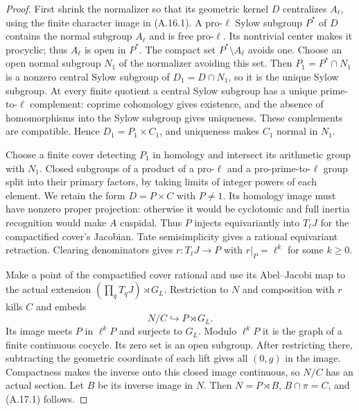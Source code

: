 \begin{proof}
First shrink the normalizer so that its geometric kernel $D$
centralizes $A_\ell$, using the finite character image in
(A.16.1). A pro-$\ell$ Sylow subgroup $P^*$ of $D$ contains
the normal subgroup $A_\ell$ and is free pro-$\ell$. Its
nontrivial center makes it procyclic; thus $A_\ell$ is open
in $P^*$. The compact set $P^*\setminus A_\ell$ avoids one.
Choose an open normal subgroup $N_1$ of the normalizer avoiding
this set. Then $P_1=P^*\cap N_1$ is a nonzero central Sylow
subgroup of $D_1=D\cap N_1$, so it is the unique Sylow subgroup.
At every finite quotient a central Sylow subgroup has a unique
prime-to-$\ell$ complement: coprime cohomology gives existence,
and the absence of homomorphisms into the Sylow subgroup gives
uniqueness. These complements are compatible. Hence
$D_1=P_1\times C_1$, and uniqueness makes $C_1$ normal in $N_1$.

Choose a finite cover detecting $P_1$ in homology and intersect
its arithmetic group with $N_1$. Closed subgroups of a product
of a pro-$\ell$ and a pro-prime-to-$\ell$ group split into
their primary factors, by taking limits of integer powers of
each element. We retain the form $D=P\times C$ with $P\ne1$.
Its homology image must have nonzero proper projection:
otherwise it would be cyclotomic and full inertia recognition
would make $A$ cuspidal. Thus $P$ injects equivariantly into
$T_\ell J$ for the compactified cover's Jacobian.
Tate semisimplicity gives a rational equivariant retraction.
Clearing denominators gives $r:T_\ell J\to P$ with
$r|_P=\ell^k$ for some $k\ge0$.

Make a point of the compactified cover rational and use its
Abel--Jacobi map to the actual extension
$(\prod_qT_qJ)\rtimes G_L$. Restriction to $N$ and composition
with $r$ kills $C$ and embeds
\[
                   N/C\hookrightarrow P\rtimes G_L.
\]
Its image meets $P$ in $\ell^kP$ and surjects to $G_L$.
Modulo $\ell^kP$ it is the graph of a finite continuous
cocycle. Its zero set is an open subgroup. After restricting
there, subtracting the geometric coordinate of each lift gives
all $(0,g)$ in the image. Compactness makes the inverse onto
this closed image continuous, so $N/C$ has an actual section.
Let $B$ be its inverse image in $N$. Then $N=P\rtimes B$,
$B\cap\pi=C$, and (A.17.1) follows.


\end{proof}
